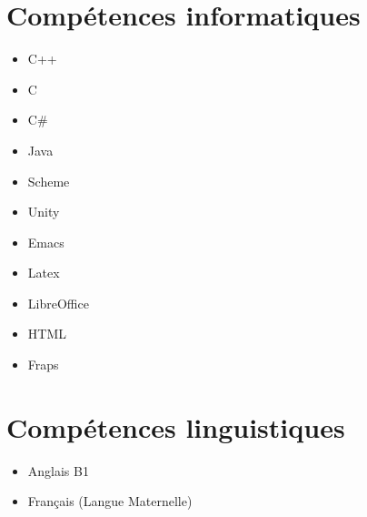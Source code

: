 \documentclass[a4paper]{article}
\begin{document}
\section*{Compétences informatiques}

\begin{itemize}
\item C++
\item C
\item C#
\item Java
\item Scheme
\item Unity
\item Emacs
\item Latex
\item LibreOffice
\item HTML
\item Fraps

\end{itemize}

\section*{Compétences linguistiques}

\begin{itemize}
\item Anglais B1
\item Français (Langue Maternelle)
\end{itemize}
\end{document}

